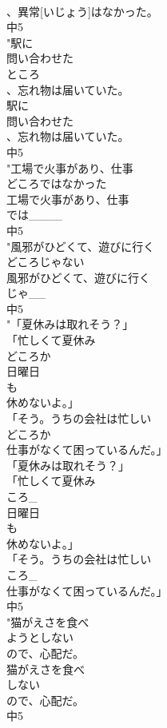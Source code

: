 \documentclass[8pt]{extreport}
\begin{document}
\begin{CJK}{UTF8}{min}
\\	、異常[いじょう]はなかった。
\\	中5
\\	"駅に
\\	問い合わせた
\\	ところ
\\	、忘れ物は届いていた。
\\	駅に
\\	問い合わせた
\\	、忘れ物は届いていた。
\\	中5
\\	"工場で火事があり、仕事
\\	どころではなかった
\\	工場で火事があり、仕事
\\	では____
\\	中5
\\	"風邪がひどくて、遊びに行く
\\	どころじゃない
\\	風邪がひどくて、遊びに行く
\\	じゃ__
\\	中5
\\	"「夏休みは取れそう？」
\\	「忙しくて夏休み
\\	どころか
\\	日曜日
\\	も
\\	休めないよ。」
\\	「そう。うちの会社は忙しい
\\	どころか
\\	仕事がなくて困っているんだ。」
\\	「夏休みは取れそう？」
\\	「忙しくて夏休み
\\	ころ_
\\	日曜日
\\	も
\\	休めないよ。」
\\	「そう。うちの会社は忙しい
\\	ころ_
\\	仕事がなくて困っているんだ。」
\\	中5
\\	"猫がえさを食べ
\\	ようとしない
\\	ので、心配だ。
\\	猫がえさを食べ
\\	しない
\\	ので、心配だ。
\\	中5

\end{CJK}
\end{document}

